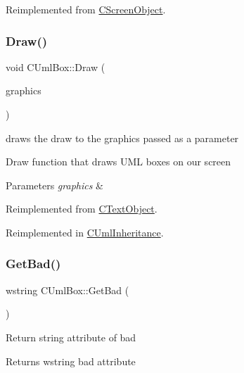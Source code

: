 Reimplemented from \mbox{\hyperlink{class_c_screen_object_a1420b59508fdab637367654438223832}{C\+Screen\+Object}}.

\mbox{\label{class_c_uml_box_a9f4f8ae512bae9039279a62923435846}} 
\subsubsection{\texorpdfstring{Draw()}{Draw()}}
{\footnotesize\ttfamily void C\+Uml\+Box\+::\+Draw (\begin{DoxyParamCaption}\item[{Gdiplus\+::\+Graphics $\ast$}]{graphics }\end{DoxyParamCaption})\hspace{0.3cm}{\ttfamily [virtual]}}



draws the draw to the graphics passed as a parameter 

Draw function that draws U\+ML boxes on our screen 
\begin{DoxyParams}{Parameters}
{\em graphics} & \\
\hline
\end{DoxyParams}


Reimplemented from \mbox{\hyperlink{class_c_text_object_a467038e52d2e587083526cc42a76131f}{C\+Text\+Object}}.



Reimplemented in \mbox{\hyperlink{class_c_uml_inheritance_a57c02d5be17880c29a3573ead25ecc36}{C\+Uml\+Inheritance}}.

\mbox{\label{class_c_uml_box_a4d51ebc9a812ac80909102be243eb3b8}} 
\subsubsection{\texorpdfstring{GetBad()}{GetBad()}}
{\footnotesize\ttfamily wstring C\+Uml\+Box\+::\+Get\+Bad (\begin{DoxyParamCaption}{ }\end{DoxyParamCaption})}

Return string attribute of bad \begin{DoxyReturn}{Returns}
wstring bad attribute 
\end{DoxyReturn}
\mbox{\label{class_c_uml_box_a41f93630b86229a23274b14b7308b1f8}} 
